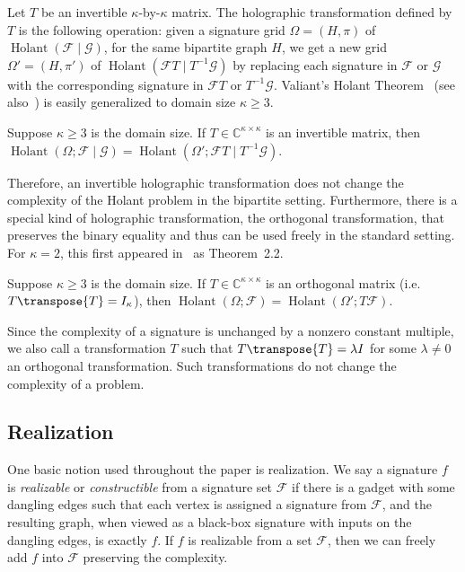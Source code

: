 \documentclass[11pt]{article}
\newcommand{\Holant}{\operatorname{Holant}}
\newcommand{\holant}[2]{\Holant(#1\mid #2)}
\begin{document}
Let $T$ be an invertible $\kappa$-by-$\kappa$ matrix.
The holographic transformation defined by $T$ is the following operation:
given a signature grid $\Omega = (H, \pi)$ of $\holant{\mathcal{F}}{\mathcal{G}}$,
for the same bipartite graph $H$,
we get a new grid $\Omega' = (H, \pi')$ of $\holant{\mathcal{F} T}{T^{-1} \mathcal{G}}$ by replacing each signature in
$\mathcal{F}$ or $\mathcal{G}$ with the corresponding signature in $\mathcal{F} T$ or $T^{-1} \mathcal{G}$.
Valiant's Holant Theorem~\cite{Val08} (see also~\cite{CC07a}) is easily generalized to domain size $\kappa \ge 3$.

\begin{theorem}
 Suppose $\kappa \ge 3$ is the domain size.
 If $T \in \mathbb{C}^{\kappa \times \kappa}$ is an invertible matrix,
 then $\Holant(\Omega; \mathcal{F} \mid \mathcal{G}) = \Holant(\Omega'; \mathcal{F} T \mid T^{-1} \mathcal{G})$.
\end{theorem}

Therefore, an invertible holographic transformation does not change the complexity of the Holant problem in the bipartite setting.
Furthermore, there is a special kind of holographic transformation, the orthogonal transformation,
that preserves the binary equality and thus can be used freely in the standard setting.
For $\kappa = 2$, this first appeared in~\cite{CLX09a} as Theorem~2.2.

\begin{theorem} \label{thm:ortho_holo_trans}
 Suppose $\kappa \ge 3$ is the domain size.
 If $T \in \mathbb{C}^{\kappa \times \kappa}$ is an orthogonal matrix (i.e.~$T \transpose{T} = I_\kappa$),
 then $\Holant(\Omega; \mathcal{F}) = \Holant(\Omega'; T \mathcal{F})$.
\end{theorem}

Since the complexity of a signature is unchanged by a nonzero constant multiple,
we also call a transformation $T$ such that $T \transpose{T} = \lambda I$ for some $\lambda \neq 0$ an orthogonal transformation.
Such transformations do not change the complexity of a problem.

\subsection{Realization}

One basic notion used throughout the paper is realization.
We say a signature $f$ is \emph{realizable} or \emph{constructible} from a signature set $\mathcal{F}$
if there is a gadget with some dangling edges such that each vertex is assigned a signature from $\mathcal{F}$,
and the resulting graph, when viewed as a black-box signature with inputs on the dangling edges, is exactly $f$.
If $f$ is realizable from a set $\mathcal{F}$, then we can freely add $f$ into $\mathcal{F}$ preserving the complexity.
\end{document}
